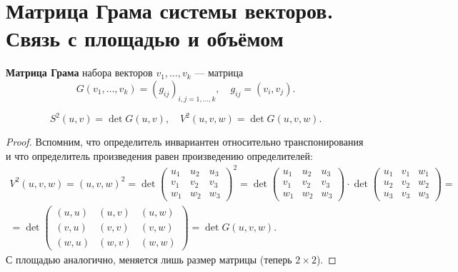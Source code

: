 \section{Матрица Грама системы векторов. Связь с площадью и объёмом}

\begin{definition}
    \textbf{Матрица Грама} набора векторов $v_1, \ldots, v_k$ --- матрица
    $$G(v_1, \ldots, v_k) = (g_{ij})_{i, j = 1, \ldots, k},\quad g_{ij} = (v_i, v_j).$$
\end{definition}

\begin{theorem}
    $$S^2(u, v) = \det G(u, v),\quad V^2(u, v, w) = \det G(u, v, w).$$
\end{theorem}

\begin{proof}
    Вспомним, что определитель инвариантен относительно транспонирования и что определитель произведения равен произведению определителей:
    $$
    \begin{array}{c}
        V^2(u, v, w) = (u, v, w)^2 = \det\begin{pmatrix}
            u_1 & u_2 & u_3\\
            v_1 & v_2 & v_3\\
            w_1 & w_2 & w_3
        \end{pmatrix}^2 = \det\begin{pmatrix}
            u_1 & u_2 & u_3\\
            v_1 & v_2 & v_3\\
            w_1 & w_2 & w_3
        \end{pmatrix}\cdot\det
        \begin{pmatrix}
            u_1 & v_1 & w_1\\
            u_2 & v_2 & w_2\\
            u_3 & v_3 & w_3
        \end{pmatrix} = {}\\{} = \det
        \begin{pmatrix}
            (u, u) & (u, v) & (u, w)\\
            (v, u) & (v, v) & (v, w)\\
            (w, u) & (w, v) & (w, w)
        \end{pmatrix} = \det G(u, v, w).
    \end{array}
    $$
    С площадью аналогично, меняется лишь размер матрицы (теперь $2 \times 2$).
\end{proof}


